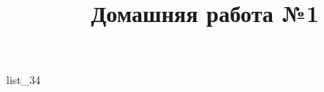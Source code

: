 \documentclass[12pt, a4paper]{article}
\begin{document}
	\title{Домашняя работа №1}
	{list_34}
\end{document}
